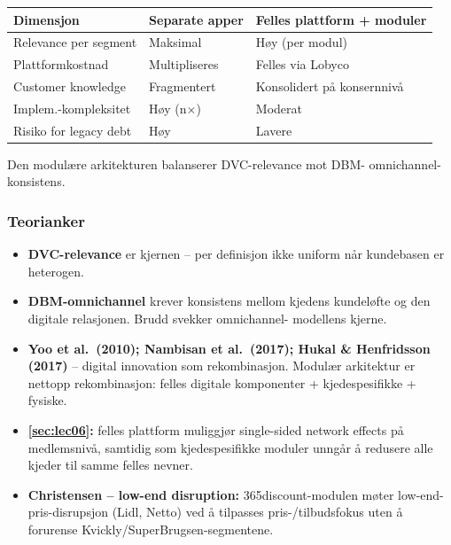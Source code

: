 \begin{tabular}{p{4.2cm}p{4cm}p{4.3cm}}
\hline
\textbf{Dimensjon} & \textbf{Separate apper} & \textbf{Felles plattform + moduler} \\
\hline
Relevance per segment & Maksimal & Høy (per modul) \\
Plattformkostnad & Multipliseres & Felles via Lobyco \\
Customer knowledge & Fragmentert & Konsolidert på konsernnivå \\
Implem.-kompleksitet & Høy (n$\times$) & Moderat \\
Risiko for legacy debt & Høy & Lavere \\
\hline
\end{tabular}

Den modulære arkitekturen balanserer DVC-relevance mot DBM-
omnichannel-konsistens.

\subsubsection*{Teorianker}
\begin{itemize}
  \item \textbf{DVC-relevance} er kjernen -- per definisjon ikke uniform når
    kundebasen er heterogen.
  \item \textbf{DBM-omnichannel} krever konsistens mellom kjedens
    kundeløfte og den digitale relasjonen. Brudd svekker omnichannel-
    modellens kjerne.
  \item \textbf{Yoo et al.\ (2010); Nambisan et al.\ (2017); Hukal \&
    Henfridsson (2017)} -- digital innovation som rekombinasjon. Modulær
    arkitektur er nettopp rekombinasjon: felles digitale komponenter +
    kjedespesifikke + fysiske.
  \item \textbf{\autoref{sec:lec06}:} felles plattform muliggjør
    single-sided network effects på medlemsnivå, samtidig som
    kjedespesifikke moduler unngår å redusere alle kjeder til samme felles
    nevner.
  \item \textbf{Christensen -- low-end disruption:} 365discount-modulen
    møter low-end-pris-disrupsjon (Lidl, Netto) ved å tilpasses
    pris-/tilbudsfokus uten å forurense Kvickly/SuperBrugsen-segmentene.
\end{itemize}

